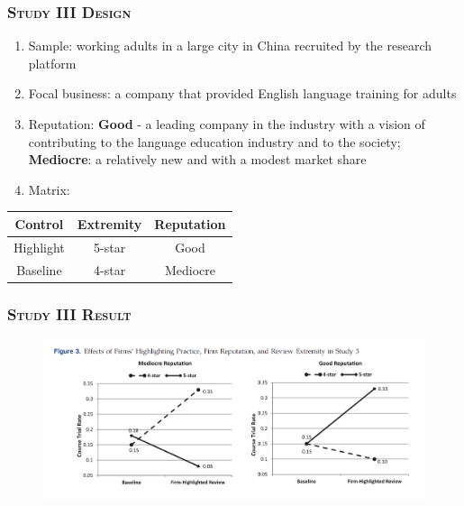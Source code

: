 \documentclass{../presentation}
\begin{document}
    \begin{frame}
        \frametitle{\textsc{Study III Design}}

            \begin{enumerate}
                \item Sample: working adults in a large city in China recruited by the research platform
                \item Focal business: a company that provided English language training for adults
                \item Reputation: \textbf{Good} - a leading company in the industry with a vision of contributing to the language education industry and to the society; \textbf{Mediocre}: a relatively new and with a modest market share

                \item Matrix:
            \end{enumerate}

            \begin{table}
                \scriptsize
                \begin{tabular}{c|c|c}
                    \toprule
                    Control & Extremity & Reputation \\
                    \midrule
                    Highlight & 5-star & Good \\
                    Baseline & 4-star & Mediocre \\
                    \bottomrule
                \end{tabular}
            \end{table}

    \end{frame}

    \begin{frame}
        \frametitle{\textsc{Study III Result}}

        \begin{figure}
            \includegraphics[width=0.8\linewidth]{pre04-imgs/pre04-3.png}
        \end{figure}

    \end{frame}
\end{document}
